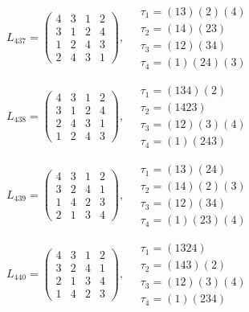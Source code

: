 $L_{437} = \begin{pmatrix} 4 & 3 & 1 & 2 \\ 3 & 1 & 2 & 4 \\ 1 & 2 & 4 & 3 \\ 2 & 4 & 3 & 1 \end{pmatrix}, \quad \begin{matrix} \tau_{1} = (1 3)(2)(4) \\ \tau_{2} = (1 4)(2 3) \\ \tau_{3} = (1 2)(3 4) \\ \tau_{4} = (1)(2 4)(3) \end{matrix}$

$L_{438} = \begin{pmatrix} 4 & 3 & 1 & 2 \\ 3 & 1 & 2 & 4 \\ 2 & 4 & 3 & 1 \\ 1 & 2 & 4 & 3 \end{pmatrix}, \quad \begin{matrix} \tau_{1} = (1 3 4)(2) \\ \tau_{2} = (1 4 2 3) \\ \tau_{3} = (1 2)(3)(4) \\ \tau_{4} = (1)(2 4 3) \end{matrix}$

$L_{439} = \begin{pmatrix} 4 & 3 & 1 & 2 \\ 3 & 2 & 4 & 1 \\ 1 & 4 & 2 & 3 \\ 2 & 1 & 3 & 4 \end{pmatrix}, \quad \begin{matrix} \tau_{1} = (1 3)(2 4) \\ \tau_{2} = (1 4)(2)(3) \\ \tau_{3} = (1 2)(3 4) \\ \tau_{4} = (1)(2 3)(4) \end{matrix}$

$L_{440} = \begin{pmatrix} 4 & 3 & 1 & 2 \\ 3 & 2 & 4 & 1 \\ 2 & 1 & 3 & 4 \\ 1 & 4 & 2 & 3 \end{pmatrix}, \quad \begin{matrix} \tau_{1} = (1 3 2 4) \\ \tau_{2} = (1 4 3)(2) \\ \tau_{3} = (1 2)(3)(4) \\ \tau_{4} = (1)(2 3 4) \end{matrix}$

